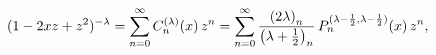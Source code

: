 \[(1-2xz+z^{2})^{-\lambda}=\sum_{n=0}^{\infty}\mathop{C^{(\lambda)}_{n}\/}%
\nolimits\!\left(x\right)z^{n}=\sum_{n=0}^{\infty}\frac{\left(2\lambda\right)_%
{n}}{\left(\lambda+\tfrac{1}{2}\right)_{n}}\mathop{P^{(\lambda-\frac{1}{2},%
\lambda-\frac{1}{2})}_{n}\/}\nolimits\!\left(x\right)z^{n},\]